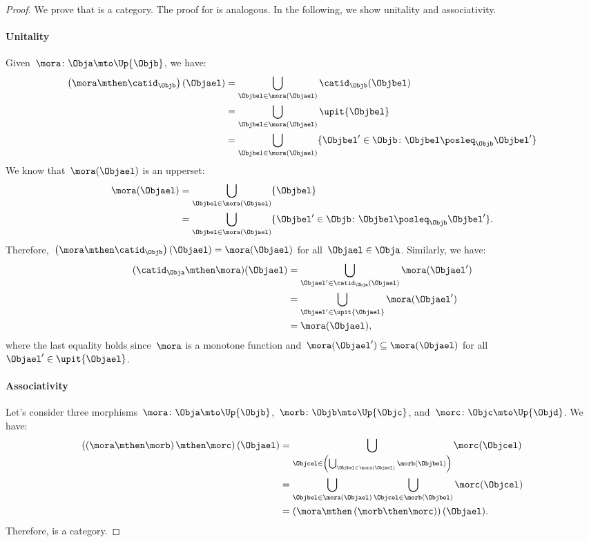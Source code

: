 \begin{proof}
We prove that \UPos is a category. The proof for \LPos is analogous. In the following, we show unitality and associativity.
\paragraph*{Unitality} Given~$\mora\colon \Obja \mto \Up{\Objb}$, we have:
\begin{equation*}
    \begin{aligned}
    \left( \mora \mthen \catid_\Objb\right)(\Objael)&=\bigcup_{\Objbel\in \mora(\Objael)}\catid_\Objb(\Objbel)\\
    &=\bigcup_{\Objbel\in \mora(\Objael)}\upit\{\Objbel\}\\
    &=\bigcup_{\Objbel\in \mora(\Objael)}\{\Objbel'\in \Objb \colon \Objbel\posleq_\Objb \Objbel' \}
    \end{aligned}
\end{equation*}
We know that~$\mora(\Objael)$ is an upperset:
\begin{equation*}
    \begin{aligned}
    \mora(\Objael)&=\bigcup_{\Objbel\in \mora(\Objael)}\{\Objbel\}\\
    &=\bigcup_{\Objbel\in \mora(\Objael)}\{ \Objbel'\in \Objb \colon \Objbel\posleq_\Objb \Objbel'\}.
    \end{aligned}
\end{equation*}
Therefore,~$\left( \mora \mthen \catid_\Objb\right)(\Objael)=\mora(\Objael)$ for all~$\Objael\in \Obja$. Similarly, we have:
\begin{equation*}
    \begin{aligned}
    (\catid_\Obja \mthen \mora)(\Objael)&=\bigcup_{\Objael'\in \catid_\Obja(\Objael)}\mora(\Objael')\\
    &=\bigcup_{\Objael'\in \upit \{\Objael\}}\mora(\Objael')\\
    &=\mora(\Objael),
    \end{aligned}
\end{equation*}
where the last equality holds since~$\mora$ is a monotone function and~$\mora(\Objael')\subseteq \mora(\Objael)$ for all~$\Objael'\in \upit \{\Objael\}$.
\paragraph*{Associativity} Let's consider three morphisms~$\mora\colon \Obja \mto \Up{\Objb}$,~$\morb\colon \Objb\mto \Up{\Objc}$, and~$\morc\colon \Objc\mto \Up{\Objd}$. We have:
\begin{equation*}
    \begin{aligned}
    \left( \left( \mora \mthen \morb\right)\mthen\morc\right)(\Objael)&=\bigcup_{\Objcel \in \left( \bigcup_{\Objbel \in \mora(\Objael)}\morb(\Objbel)\right)}\morc(\Objcel)\\
    &=\bigcup_{\Objbel\in \mora(\Objael)}\bigcup_{\Objcel\in \morb(\Objbel)}\morc(\Objcel)\\
    &=\left( \mora \mthen \left( \morb\then \morc\right)\right)(\Objael).
    \end{aligned}
\end{equation*}
Therefore, \UPos is a category.
\end{proof}

